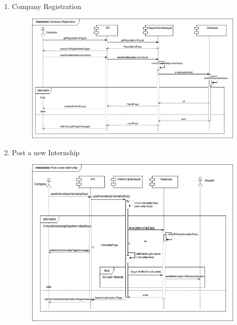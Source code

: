 \begin{enumerate}
    \newpage
    \item Company Registration
    \begin{figure}[h!]
            \centering  \includegraphics[width=1\textwidth]{DD/Images/Interactions/INT08_CompanyRegistration.drawio.png}
            \label{fig:ComponentViewDiagram}
    \end{figure}

    \newpage
    \item Post a new Internship
    \begin{figure}[h!]
            \centering  \includegraphics[width=1\textwidth]{DD/Images/Interactions/INT09_PostNewInternship.drawio.png}
            \label{fig:ComponentViewDiagram}
    \end{figure}
\end{enumerate}